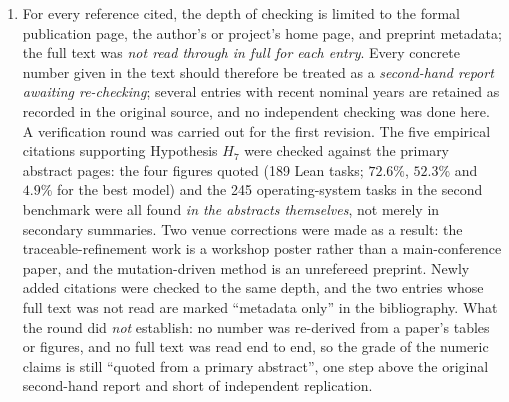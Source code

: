 \begin{enumerate}[label=(L\arabic*)]
\item For every reference cited, the depth of checking is limited to the formal publication
      page, the author's or project's home page, and preprint metadata; the full text was
      \emph{not read through in full for each entry}. Every concrete number given in the
      text should therefore be treated as a \emph{second-hand report awaiting re-checking};
      several entries with recent nominal years are retained as recorded in the original
      source, and no independent checking was done here.
      A verification round was carried out for the first revision. The five empirical
      citations supporting Hypothesis $H_7$ were checked against the primary abstract pages:
      the four figures quoted (189 Lean tasks; $72.6\%$, $52.3\%$ and $4.9\%$ for the best
      model) and the 245 operating-system tasks in the second benchmark were all found
      \emph{in the abstracts themselves}, not merely in secondary summaries. Two venue
      corrections were made as a result: the traceable-refinement work is a workshop poster
      rather than a main-conference paper, and the mutation-driven method is an unrefereed
      preprint. Newly added citations were checked to the same depth, and the two entries
      whose full text was not read are marked ``metadata only'' in the bibliography.
      What the round did \emph{not} establish: no number was re-derived from a paper's tables
      or figures, and no full text was read end to end, so the grade of the numeric claims is
      still ``quoted from a primary abstract'', one step above the original second-hand
      report and short of independent replication.


\end{enumerate}
